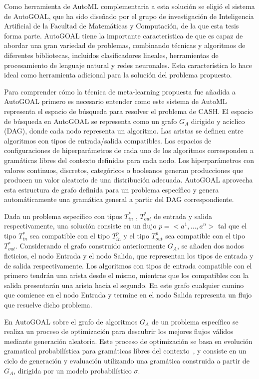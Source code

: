 Como herramienta de AutoML complementaria a esta solución se eligió el sistema de AutoGOAL, que ha sido diseñado por el grupo de investigación de Inteligencia Artificial de la Facultad de Matemáticas y Computación, de la que esta tesis forma parte. AutoGOAL tiene la importante característica de que es capaz de abordar una gran variedad de problemas, combinando técnicas y algoritmos de diferentes bibliotecas, incluidos clasificadores lineales, herramientas de procesamiento de lenguaje natural y redes neuronales. Esta característica lo hace ideal como herramienta adicional para la solución del problema propuesto.

Para comprender cómo la técnica de meta-learning propuesta fue añadida a AutoGOAL primero es necesario entender como este sistema de AutoML representa el espacio de búsqueda para resolver el problema de CASH. El espacio de búsqueda en AutoGOAL se representa como un grafo $G_A$ dirigido y acíclico (DAG), donde cada nodo representa un algoritmo. Las aristas se definen entre algoritmos con tipos de entrada/salida compatibles. Los espacios de configuraciones de hiperparámetros de cada uno de los algoritmos corresponden a gramáticas libres del contexto definidas para cada nodo. Los hiperparámetros con valores continuos, discretos, categóricos o booleanos generan producciones que producen un valor aleatorio de una distribución adecuada. AutoGOAL aprovecha esta estructura de grafo definida para un problema específico y genera automáticamente una gramática general a partir del DAG correspondiente.

Dada un problema específico con tipos $T^*_{in}$ , $T^*_{out}$ de entrada y salida respectivamente, una solución consiste en un flujo $p =<a^1, ..., a^n >$ tal que el tipo $T^*_{in}$ sea compatible con el tipo $T^p_{in}$ y el tipo $T^p_{out}$ sea compatible con el tipo $T^*_{out}$. Considerando el grafo construido anteriormente $G_A$, se añaden dos nodos ficticios, el nodo Entrada y el nodo Salida, que representan los tipos de entrada y de salida respectivamente. Los algoritmos con tipos de entrada compatible con el primero tendrán una arista desde el mismo, mientras que los compatibles con la salida presentarán una arista hacia el segundo. En este grafo cualquier camino que comience en el nodo Entrada y termine en el nodo Salida representa un flujo que resuelve dicho problema.

En AutoGOAL sobre el grafo de algoritmos $G_A$ de un problema específico se realiza un proceso de optimización para descubrir los mejores flujos válidos mediante generación aleatoria. Este proceso de optimización se basa en evolución gramatical probabilística para gramáticas libres del contexto~\cite{pge2015}, y consiste en un ciclo de generación y evaluación utilizando una gramática construida a partir de $G_A$, dirigida por un modelo probabilístico $\sigma$.


